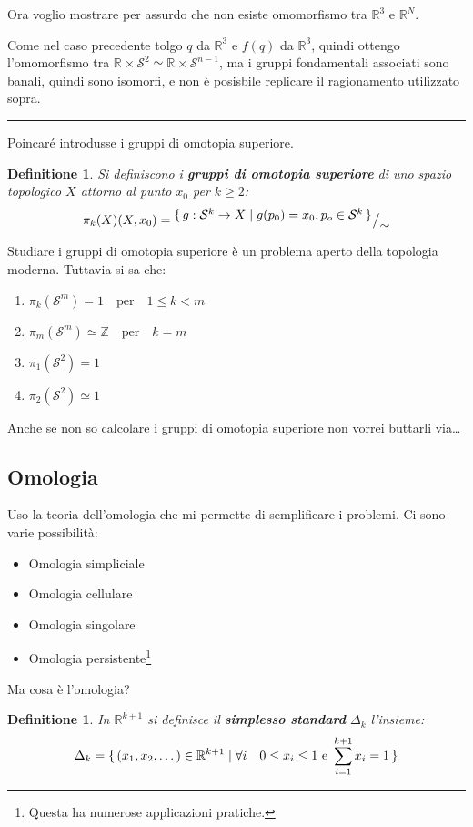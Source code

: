 \documentclass{article}
\newtheorem{definition}[theorem]{Definitione}
\newenvironment{proof}{{\bf Dimostrazione:}}{\hfill\rule{2mm}{2mm}}
\newcommand{\Z}{\mathbb{Z}}
\newcommand{\RN}[1][]{\mathbb{R}^#1}
\newcommand{\Sph}[1][]{\mathcal{S}^#1}
\newcommand*\quot[2]{{^{\textstyle #1}\big/_{\textstyle #2}}}
\begin{document}
Ora voglio mostrare per assurdo che non esiste omomorfismo tra $ \RN{3} $ e $ \RN{N} $.

\begin{proof}
  Come nel caso precedente tolgo $ q $ da $ \RN{3} $ e $ f(q) $ da $ \RN{3} $, quindi ottengo
  l'omomorfismo tra $ \RN{} \times \Sph{2} \simeq \RN{} \times \Sph{n-1} $, ma i gruppi fondamentali
  associati sono banali, quindi sono isomorfi, e non è posisbile replicare il ragionamento utilizzato sopra.
\end{proof}

Poincaré introdusse i gruppi di omotopia superiore.

\begin{definition}
  Si definiscono i \textbf{gruppi di omotopia superiore} di uno spazio topologico $ X $
  attorno al punto $ x_0 $ per $ k \geq 2 $:
  \[
    \pi_k(X) (X, x_0) = \quot{\set{ g: \Sph{k} \to X | g(p_0) = x_0, p_o \in \Sph{k}}}{\sim}
  \]
\end{definition}
Studiare i gruppi di omotopia superiore è un problema aperto della topologia moderna.
Tuttavia si sa che:
\begin{enumerate}
\item $ \pi_k(\Sph{m}) = 1 \quad \text{per} \quad 1 \leq k < m $
\item $ \pi_m(\Sph{m}) \simeq \Z \quad \text{per} \quad k = m $
\item $ \pi_1(\Sph{2}) = 1 $
\item $ \pi_2(\Sph{2}) \simeq 1 $
\end{enumerate}

Anche se non so calcolare i gruppi di omotopia superiore non vorrei buttarli via\dots

\subsection{Omologia}

Uso la teoria dell'omologia che mi permette di semplificare i problemi.
Ci sono varie possibilità:
\begin{itemize}
  \item Omologia simpliciale
  \item Omologia cellulare
  \item Omologia singolare
  \item Omologia persistente\footnote{Questa ha numerose applicazioni pratiche.}
\end{itemize}
Ma cosa è l'omologia?

\begin{definition}
  In $ \RN{k+1} $ si definisce il \textbf{simplesso standard} $ \Delta_k $ l'insieme:
  \[
    \Delta_k = \set{(x_1,x_2,\dots) \in \RN{k+1} | \forall i \quad 0 \leq x_i \leq 1 \text{ e } \sum_{i=1}^{k+1}x_i = 1}
  \]
\end{definition}
\end{document}
